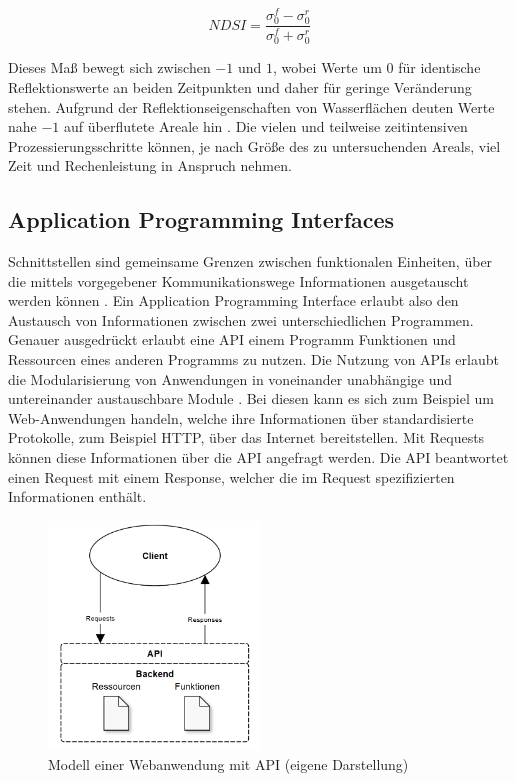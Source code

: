\begin{equation}
    NDSI = \frac{\sigma_0^f-\sigma_0^r}{\sigma_0^f+\sigma_0^r}
\end{equation} 

Dieses Maß bewegt sich zwischen $-1$ und $1$, wobei Werte um $0$ für identische Reflektionswerte an beiden Zeitpunkten und daher für geringe Veränderung stehen. 
Aufgrund der Reflektionseigenschaften von Wasserflächen deuten Werte nahe $-1$ auf überflutete Areale hin \cite{flood_proxy_mapping_ndsi}. 
Die vielen und teilweise zeitintensiven Prozessierungsschritte können, je nach Größe des zu untersuchenden Areals, viel Zeit und Rechenleistung in Anspruch nehmen.

\subsection{Application Programming Interfaces}
Schnittstellen sind gemeinsame Grenzen zwischen funktionalen Einheiten, über die mittels vorgegebener Kommunikationswege Informationen ausgetauscht werden können 
\cite{geospatial_apis}. Ein Application Programming Interface erlaubt also den Austausch von Informationen zwischen zwei unterschiedlichen Programmen. 
Genauer ausgedrückt erlaubt eine API einem Programm Funktionen und Ressourcen eines anderen Programms zu nutzen. 
Die Nutzung von APIs erlaubt die Modularisierung von Anwendungen in voneinander unabhängige und untereinander austauschbare Module \cite{geospatial_apis}.
Bei diesen kann es sich zum Beispiel um Web-Anwendungen handeln, welche ihre Informationen über standardisierte Protokolle, zum Beispiel HTTP, über das Internet bereitstellen. 
Mit Requests können diese Informationen über die API angefragt werden. 
Die API beantwortet einen Request mit einem Response, welcher die im Request spezifizierten Informationen enthält.\\ 

\begin{figure}[H]
    \centering
    \includegraphics[width=0.5\textwidth]{Bilder/api.png}
    \caption{Modell einer Webanwendung mit API (eigene Darstellung)}
    \label{api_model}
\end{figure}

